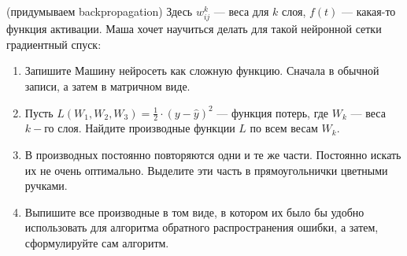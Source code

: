 \documentclass[12pt, a4paper, oneside]{article}
\theoremstyle{plain} %
\theoremstyle{definition}
\begin{document}
\begin{problem}{(придумываем backpropagation)}
	Здесь $w_{ij}^k$ --- веса для $k$ слоя, $f(t)$ --- какая-то функция активации. Маша хочет научиться делать для такой нейронной сетки градиентный спуск: 
	
	\begin{enumerate}
		\item  Запишите Машину нейросеть как сложную функцию. Сначала в обычной записи, а затем в матричном виде. 
		
		\item  Пусть $L(W_1, W_2, W_3) = \frac{1}{2} \cdot (y - \hat y)^2$ --- функция потерь, где $W_k$ --- веса $k-$го слоя.  Найдите производные функции $L$ по всем весам $W_k$.
		
		\item В производных постоянно повторяются одни и те же части. Постоянно искать их не очень оптимально. Выделите эти часть в прямоугольнички цветными ручками. 
		
		\item Выпишите все производные в том виде, в котором их было бы удобно использовать для алгоритма обратного распространения ошибки, а затем, сформулируйте сам алгоритм.
	\end{enumerate}
\end{problem}
\end{document}
